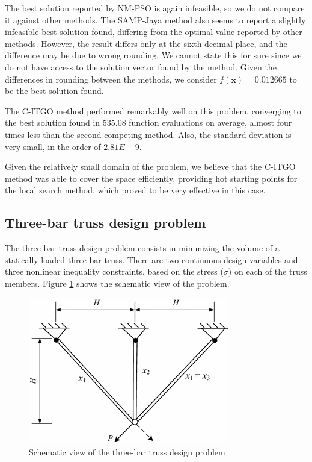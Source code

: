 The best solution reported by NM-PSO is again infeasible, so we do not compare it against other methods. The SAMP-Jaya method also seems to report a slightly infeasible best solution found, differing from the optimal value reported by other methods. However, the result differs only at the sixth decimal place, and the difference may be due to wrong rounding. We cannot state this for sure since we do not have access to the solution vector found by the method. Given the differences in rounding between the methods, we consider $f(\bm{x}) = 0.012665$ to be the best solution found.

The C-ITGO method performed remarkably well on this problem, converging to the best solution found in 535.08 function evaluations on average, almost four times less than the second competing method. Also, the standard deviation is very small, in the order of $2.81E-9$. 

Given the relatively small domain of the problem, we believe that the C-ITGO method was able to cover the space efficiently, providing hot starting points for the local search method, which proved to be very effective in this case.




\subsection{Three-bar truss design problem}

The three-bar truss design problem \citep{TB} consists in minimizing the volume of a statically loaded three-bar truss. There are two continuous design variables and three nonlinear inequality constraints, based on the stress ($\sigma$) on each of the truss members. Figure \ref{fig:TB} shows the schematic view of the problem.

\begin{figure}[h]
\begin{center}
\includegraphics[scale=0.5]{Imgs/TB.png}
\end{center}
\captionsetup{justification=centering}
\caption{Schematic view of the three-bar truss design problem}\label{fig:TB}
\end{figure}


